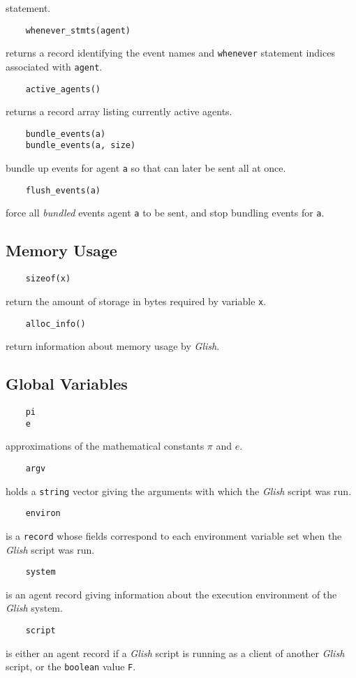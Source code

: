 statement.
\begin{verbatim}
    whenever_stmts(agent)
\end{verbatim}
returns a record identifying the event names and {\tt whenever} statement
indices associated with {\tt agent}.
\begin{verbatim}
    active_agents()
\end{verbatim}
returns a record array listing currently active agents.
\begin{verbatim}
    bundle_events(a)
    bundle_events(a, size)
\end{verbatim}
bundle up events for agent {\tt a} so that can later be sent all at once.
\begin{verbatim}
    flush_events(a)
\end{verbatim}
force all {\em bundled} events agent {\tt a} to be sent, and stop bundling
events for {\tt a}.

\subsection{Memory Usage}

\begin{verbatim}
    sizeof(x)
\end{verbatim}
return the amount of storage in bytes required by variable {\tt x}.
\begin{verbatim}
    alloc_info()
\end{verbatim}
return information about memory usage by {\em Glish}.

\subsection{Global Variables}
\begin{verbatim}
    pi
    e
\end{verbatim}
approximations of the mathematical constants $\pi$ and $e$.
\begin{verbatim}
    argv
\end{verbatim}
holds a {\tt string} vector giving the arguments with 
which the {\em Glish}
script was run.
\begin{verbatim}
    environ
\end{verbatim}
is a {\tt record} whose fields correspond to each environment variable
set when the {\em Glish} script was run.
\begin{verbatim}
    system
\end{verbatim}
is an agent record giving information about the execution environment
of the {\em Glish} system.
\begin{verbatim}
    script
\end{verbatim}
is either an agent record if a {\em Glish} script is running as a client of
another {\em Glish} script, or the {\tt boolean} value {\tt F}.

